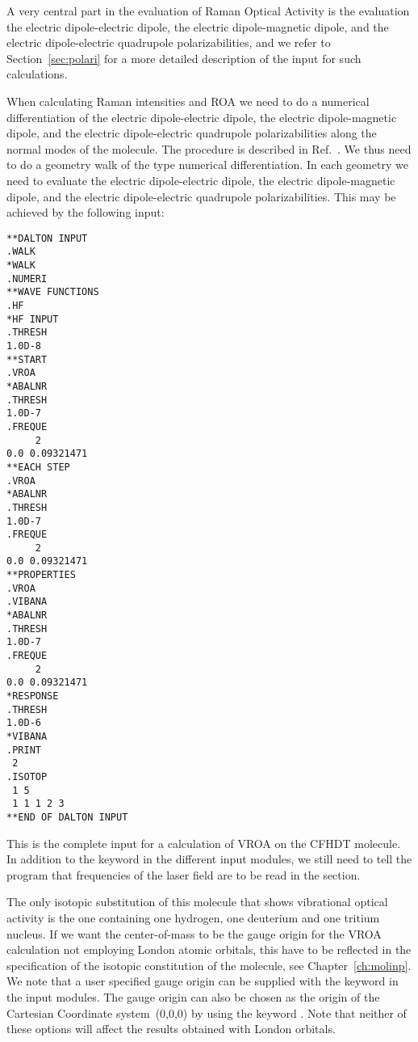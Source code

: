 A very central part in the evaluation of Raman Optical Activity is the
evaluation the electric dipole-electric dipole, the electric
dipole-magnetic dipole, and the electric dipole-electric quadrupole
polarizabilities, and we refer to Section~\ref{sec:polari} for a more
detailed description of the input for such calculations.


When calculating Raman intensities and
ROA we need to do a numerical
differentiation of the electric
dipole-electric dipole, the electric
dipole-magnetic dipole, and the electric dipole-electric quadrupole
polarizabilities along the normal modes of the
molecule. The procedure
is described in Ref.~\cite{thkrklbpjjofd99}. We thus need to do a
geometry walk of the type numerical differentiation. In each geometry
we need to evaluate the electric dipole-electric dipole, the electric
dipole-magnetic dipole, and the electric dipole-electric quadrupole
polarizabilities. This may be achieved by the following input:

\begin{verbatim}
**DALTON INPUT
.WALK
*WALK
.NUMERI
**WAVE FUNCTIONS
.HF
*HF INPUT
.THRESH
1.0D-8
**START
.VROA
*ABALNR
.THRESH
1.0D-7
.FREQUE
     2
0.0 0.09321471
**EACH STEP
.VROA
*ABALNR
.THRESH
1.0D-7
.FREQUE
     2
0.0 0.09321471
**PROPERTIES
.VROA
.VIBANA
*ABALNR
.THRESH
1.0D-7
.FREQUE
     2
0.0 0.09321471
*RESPONSE
.THRESH
1.0D-6
*VIBANA
.PRINT
 2
.ISOTOP
 1 5
 1 1 1 2 3
**END OF DALTON INPUT
\end{verbatim}

This is the complete input for a calculation of
VROA on the CFHDT
molecule. In addition to the keyword  in
the different  input modules, we still need to tell
the program that frequencies of the laser field are to be read in the
 section.

The only isotopic substitution of this molecule that shows vibrational
optical activity is the one containing one hydrogen, one deuterium and
one tritium nucleus. If we want the center-of-mass to be the gauge origin for the VROA
calculation not employing London atomic orbitals, this have to be
reflected in the specification of the isotopic constitution of the
molecule, see Chapter~\ref{ch:molinp}. We note that a user specified
gauge origin can be supplied with the keyword  in the
 input modules. The gauge origin can also be chosen as
the origin of the Cartesian Coordinate system~(0,0,0) by using the
keyword . Note that neither of these options will affect the
results obtained with London orbitals.

